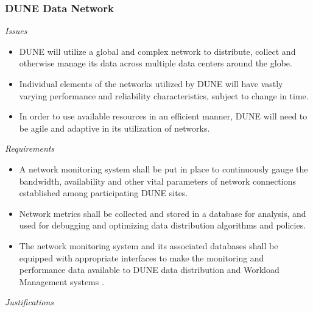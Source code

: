 \subsubsection{DUNE Data Network}
\textit{Issues}
\begin{itemize}
	\item DUNE will utilize a global and complex network to distribute, collect and otherwise manage its data across multiple data centers around the globe.
	
	\item Individual elements of the networks utilized by DUNE will have vastly varying performance and reliability characteristics, subject to change in time.
	
	\item In order to use available resources in an efficient manner, DUNE will need to be agile and adaptive in its utilization of networks.
\end{itemize}
\noindent
\textit{Requirements}
\begin{itemize}
	
	\item A network monitoring system shall be put in place to continuously gauge the bandwidth, 
	availability and other vital parameters of network connections established among participating DUNE sites.
	
	\item Network metrics shall be collected and stored in a database for analysis, and used for debugging and optimizing data distribution algorithms and policies.
	
	\item The network monitoring system and its associated databases  shall be equipped with appropriate interfaces to make the monitoring and performance data available to DUNE data distribution and Workload Management systems .
	
\end{itemize}
\noindent
\textit{Justifications}

